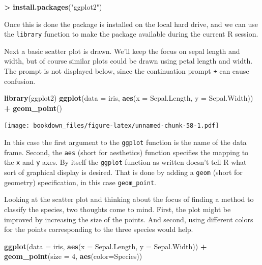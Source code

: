 \documentclass[
]{krantz}
\makeatletter
\newenvironment{Shaded}{\begin{snugshade}}{\end{snugshade}}
\newcommand{\DataTypeTok}[1]{\textcolor[rgb]{0.27,0.27,0.27}{#1}}
\newcommand{\DecValTok}[1]{\textcolor[rgb]{0.06,0.06,0.06}{#1}}
\newcommand{\KeywordTok}[1]{\textcolor[rgb]{0.27,0.27,0.27}{\textbf{#1}}}
\newcommand{\NormalTok}[1]{#1}
\newcommand{\OperatorTok}[1]{\textcolor[rgb]{0.43,0.43,0.43}{\textbf{#1}}}
\newcommand{\StringTok}[1]{\textcolor[rgb]{0.5,0.5,0.5}{#1}}
\newenvironment{kframe}{%
\medskip{}
\setlength{\fboxsep}{.8em}
 \def\at@end@of@kframe{}%
 \ifinner\ifhmode%
  \def\at@end@of@kframe{\end{minipage}}%
  \begin{minipage}{\columnwidth}%
 \fi\fi%
 \def\FrameCommand##1{\hskip\@totalleftmargin \hskip-\fboxsep
 \colorbox{shadecolor}{##1}\hskip-\fboxsep
     \hskip-\linewidth \hskip-\@totalleftmargin \hskip\columnwidth}%
 \MakeFramed {\advance\hsize-\width
   \@totalleftmargin\z@ \linewidth\hsize
   \@setminipage}}%
 {\par\unskip\endMakeFramed%
 \at@end@of@kframe}
\renewenvironment{Shaded}{\begin{kframe}}{\end{kframe}}
\makeatother
\begin{document}
\begin{Shaded}
\begin{Highlighting}[]
\OperatorTok{\textgreater{}}\StringTok{ }\KeywordTok{install.packages}\NormalTok{(}\StringTok{"ggplot2"}\NormalTok{)}
\end{Highlighting}
\end{Shaded}

Once this is done the package is installed on the local hard drive, and we can use the \texttt{library} function to make the package available during the current R session.

Next a basic scatter plot is drawn. We'll keep the focus on sepal length and width, but of course similar plots could be drawn using petal length and width. The prompt is not displayed below, since the continuation prompt \texttt{+} can cause confusion.

\begin{Shaded}
\begin{Highlighting}[]
\KeywordTok{library}\NormalTok{(ggplot2)}
\KeywordTok{ggplot}\NormalTok{(}\DataTypeTok{data =}\NormalTok{ iris, }\KeywordTok{aes}\NormalTok{(}\DataTypeTok{x =}\NormalTok{ Sepal.Length, }\DataTypeTok{y =}\NormalTok{ Sepal.Width)) }\OperatorTok{+}\StringTok{ }
\StringTok{    }\KeywordTok{geom\_point}\NormalTok{()}
\end{Highlighting}
\end{Shaded}

\texttt{[image: bookdown\_files/figure-latex/unnamed-chunk-58-1.pdf]}

In this case the first argument to the \texttt{ggplot} function is the name of the data frame. Second, the \texttt{aes} (short for aesthetics) function specifies the mapping to the \texttt{x} and \texttt{y} axes. By itself the \texttt{ggplot} function as written doesn't tell R what sort of graphical display is desired. That is done by adding a \texttt{geom} (short for geometry) specification, in this case \texttt{geom\_point}.

Looking at the scatter plot and thinking about the focus of finding a method to classify the species, two thoughts come to mind. First, the plot might be improved by increasing the size of the points. And second, using different colors for the points corresponding to the three species would help.

\begin{Shaded}
\begin{Highlighting}[]
\KeywordTok{ggplot}\NormalTok{(}\DataTypeTok{data =}\NormalTok{ iris, }\KeywordTok{aes}\NormalTok{(}\DataTypeTok{x =}\NormalTok{ Sepal.Length, }\DataTypeTok{y =}\NormalTok{ Sepal.Width)) }\OperatorTok{+}\StringTok{ }
\StringTok{    }\KeywordTok{geom\_point}\NormalTok{(}\DataTypeTok{size =} \DecValTok{4}\NormalTok{, }\KeywordTok{aes}\NormalTok{(}\DataTypeTok{color=}\NormalTok{Species))}
\end{Highlighting}
\end{Shaded}
\end{document}
